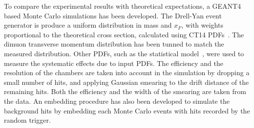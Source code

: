 \documentclass[reprint,aps,unsortedaddress,superscriptaddress,prl,floatfix,showpacs,linenumbers,final]{revtex4-2}
\begin{document}
To compare the experimental results with theoretical expectations,
a GEANT4~\cite{agostinelli2003,allison2006,allison2016} based Monte Carlo simulations has been developed.
The Drell-Yan event generator is produce a uniform distribution in mass and $x_F$,
with weights proportional to the theoretical cross section, calculated using CT14 PDFs~\cite{hou2018}.
The dimuon transverse momentum distribution has been tunned to match the measured distribution.
Other PDFs, such as the statistical model~\cite{soffer2019}, were used to measure the systematic effects due to input PDFs.
The efficiency and the resolution of the chambers are taken into account in the simulation
by dropping a small number of hits, and applying Gaussian smearing to the drift distance of the remaining hits.
Both the efficiency and the width of the smearing are taken from the data.
An embedding procedure has also been developed to simulate the background hits by embedding each Monte Carlo events
with hits recorded by the random trigger.
\end{document}
